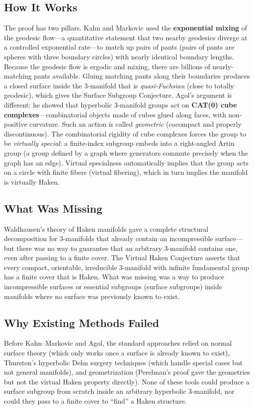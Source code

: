 \subsection{How It Works}
The proof has two pillars. Kahn and Markovic used the \textbf{exponential mixing} of the geodesic flow---a quantitative statement that two nearby geodesics diverge at a controlled exponential rate---to match up pairs of pants (pairs of pants are spheres with three boundary circles) with nearly identical boundary lengths. Because the geodesic flow is ergodic and mixing, there are billions of nearly-matching pants available. Gluing matching pants along their boundaries produces a closed surface inside the 3-manifold that is \emph{quasi-Fuchsian} (close to totally geodesic), which gives the Surface Subgroup Conjecture. Agol's argument is different: he showed that hyperbolic 3-manifold groups act on \textbf{CAT(0) cube complexes}---combinatorial objects made of cubes glued along faces, with non-positive curvature. Such an action is called \emph{geometric} (cocompact and properly discontinuous). The combinatorial rigidity of cube complexes forces the group to be \emph{virtually special}: a finite-index subgroup embeds into a right-angled Artin group (a group defined by a graph where generators commute precisely when the graph has an edge). Virtual specialness automatically implies that the group acts on a circle with finite fibers (virtual fibering), which in turn implies the manifold is virtually Haken.

\subsection{What Was Missing}
Waldhausen's theory of Haken manifolds gave a complete structural decomposition for 3-manifolds that already contain an incompressible surface---but there was no way to guarantee that an arbitrary 3-manifold contains one, even after passing to a finite cover. The Virtual Haken Conjecture asserts that every compact, orientable, irreducible 3-manifold with infinite fundamental group has a finite cover that is Haken. What was missing was a way to produce incompressible surfaces or essential subgroups (surface subgroups) inside manifolds where no surface was previously known to exist.

\subsection{Why Existing Methods Failed}
Before Kahn--Markovic and Agol, the standard approaches relied on normal surface theory (which only works once a surface is already known to exist), Thurston's hyperbolic Dehn surgery techniques (which handle special cases but not general manifolds), and geometrization (Perelman's proof gave the geometries but not the virtual Haken property directly). None of these tools could produce a surface subgroup from scratch inside an arbitrary hyperbolic 3-manifold, nor could they pass to a finite cover to ``find'' a Haken structure.

